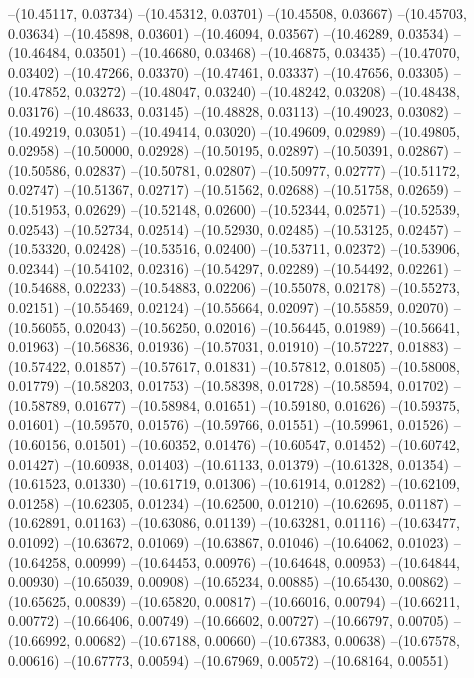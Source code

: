 --(10.45117, 0.03734)
--(10.45312, 0.03701)
--(10.45508, 0.03667)
--(10.45703, 0.03634)
--(10.45898, 0.03601)
--(10.46094, 0.03567)
--(10.46289, 0.03534)
--(10.46484, 0.03501)
--(10.46680, 0.03468)
--(10.46875, 0.03435)
--(10.47070, 0.03402)
--(10.47266, 0.03370)
--(10.47461, 0.03337)
--(10.47656, 0.03305)
--(10.47852, 0.03272)
--(10.48047, 0.03240)
--(10.48242, 0.03208)
--(10.48438, 0.03176)
--(10.48633, 0.03145)
--(10.48828, 0.03113)
--(10.49023, 0.03082)
--(10.49219, 0.03051)
--(10.49414, 0.03020)
--(10.49609, 0.02989)
--(10.49805, 0.02958)
--(10.50000, 0.02928)
--(10.50195, 0.02897)
--(10.50391, 0.02867)
--(10.50586, 0.02837)
--(10.50781, 0.02807)
--(10.50977, 0.02777)
--(10.51172, 0.02747)
--(10.51367, 0.02717)
--(10.51562, 0.02688)
--(10.51758, 0.02659)
--(10.51953, 0.02629)
--(10.52148, 0.02600)
--(10.52344, 0.02571)
--(10.52539, 0.02543)
--(10.52734, 0.02514)
--(10.52930, 0.02485)
--(10.53125, 0.02457)
--(10.53320, 0.02428)
--(10.53516, 0.02400)
--(10.53711, 0.02372)
--(10.53906, 0.02344)
--(10.54102, 0.02316)
--(10.54297, 0.02289)
--(10.54492, 0.02261)
--(10.54688, 0.02233)
--(10.54883, 0.02206)
--(10.55078, 0.02178)
--(10.55273, 0.02151)
--(10.55469, 0.02124)
--(10.55664, 0.02097)
--(10.55859, 0.02070)
--(10.56055, 0.02043)
--(10.56250, 0.02016)
--(10.56445, 0.01989)
--(10.56641, 0.01963)
--(10.56836, 0.01936)
--(10.57031, 0.01910)
--(10.57227, 0.01883)
--(10.57422, 0.01857)
--(10.57617, 0.01831)
--(10.57812, 0.01805)
--(10.58008, 0.01779)
--(10.58203, 0.01753)
--(10.58398, 0.01728)
--(10.58594, 0.01702)
--(10.58789, 0.01677)
--(10.58984, 0.01651)
--(10.59180, 0.01626)
--(10.59375, 0.01601)
--(10.59570, 0.01576)
--(10.59766, 0.01551)
--(10.59961, 0.01526)
--(10.60156, 0.01501)
--(10.60352, 0.01476)
--(10.60547, 0.01452)
--(10.60742, 0.01427)
--(10.60938, 0.01403)
--(10.61133, 0.01379)
--(10.61328, 0.01354)
--(10.61523, 0.01330)
--(10.61719, 0.01306)
--(10.61914, 0.01282)
--(10.62109, 0.01258)
--(10.62305, 0.01234)
--(10.62500, 0.01210)
--(10.62695, 0.01187)
--(10.62891, 0.01163)
--(10.63086, 0.01139)
--(10.63281, 0.01116)
--(10.63477, 0.01092)
--(10.63672, 0.01069)
--(10.63867, 0.01046)
--(10.64062, 0.01023)
--(10.64258, 0.00999)
--(10.64453, 0.00976)
--(10.64648, 0.00953)
--(10.64844, 0.00930)
--(10.65039, 0.00908)
--(10.65234, 0.00885)
--(10.65430, 0.00862)
--(10.65625, 0.00839)
--(10.65820, 0.00817)
--(10.66016, 0.00794)
--(10.66211, 0.00772)
--(10.66406, 0.00749)
--(10.66602, 0.00727)
--(10.66797, 0.00705)
--(10.66992, 0.00682)
--(10.67188, 0.00660)
--(10.67383, 0.00638)
--(10.67578, 0.00616)
--(10.67773, 0.00594)
--(10.67969, 0.00572)
--(10.68164, 0.00551)

